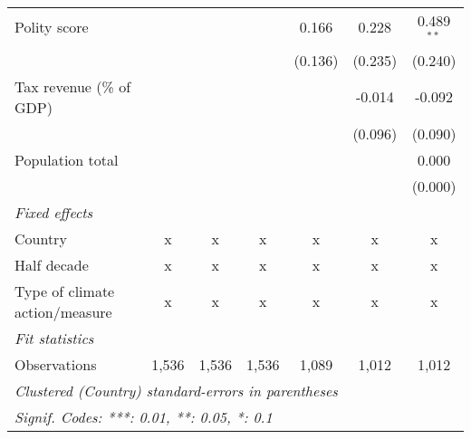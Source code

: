\begin{tabular}{lcccccc}
   Polity score                                                          &         &         &              & 0.166        & 0.228        & 0.489$^{**}$\\   
                                                                         &         &         &              & (0.136)      & (0.235)      & (0.240)\\   
   Tax revenue (\% of GDP)                                               &         &         &              &              & -0.014       & -0.092\\   
                                                                         &         &         &              &              & (0.096)      & (0.090)\\   
   Population total                                                      &         &         &              &              &              & 0.000\\   
                                                                         &         &         &              &              &              & (0.000)\\   
   \emph{Fixed effects}\\
   Country                                                               & x       & x       & x            & x            & x            & x\\  
   Half decade                                                           & x       & x       & x            & x            & x            & x\\  
   Type of climate action/measure                                        & x       & x       & x            & x            & x            & x\\  
   \midrule \emph{Fit statistics}\\
   Observations                                                          & 1,536   & 1,536   & 1,536        & 1,089        & 1,012        & 1,012\\  
   \midrule
   \multicolumn{7}{l}{\emph{Clustered (Country) standard-errors in parentheses}}\\
   \multicolumn{7}{l}{\emph{Signif. Codes: ***: 0.01, **: 0.05, *: 0.1}}\\
\end{tabular}
\par\endgroup


